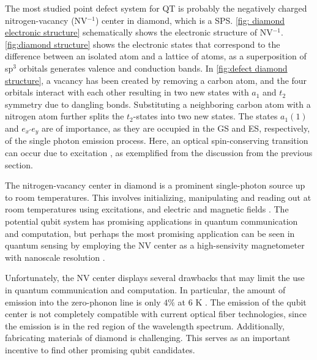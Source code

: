 The most studied point defect system for QT is probably the negatively charged nitrogen-vacancy (NV$^{-1}$) center in diamond, which is a SPS. \autoref{fig: diamond electronic structure} schematically shows the electronic structure of NV$^{-1}$. \autoref{fig:diamond structure} shows the electronic states that correspond to the difference between an isolated atom and a lattice of atoms, as a superposition of sp$^3$ orbitals generates valence and conduction bands.
In \autoref{fig:defect diamond structure}, a vacancy has been created by removing a carbon atom, and the four orbitals interact with each other resulting in two new states with $a_1$ and $t_2$ symmetry due to dangling bonds. Substituting a neighboring carbon atom with a nitrogen atom further splits the $t_2$-states into two new states.
The states $a_1(1)$ and $e_{x'}e_y$ are of importance, as they are occupied in the GS and ES, respectively, of the single photon emission process. Here, an optical spin-conserving transition can occur due to excitation \cite{Gordon2013}, as exemplified from the discussion from the previous section.

\noindent The nitrogen-vacancy center in diamond is a prominent single-photon source up to room temperatures. This involves initializing, manipulating and reading out at room temperatures using excitations, and electric and magnetic fields \cite{Gordon2013}. The potential qubit system has promising applications in quantum communication and computation, but
perhaps the most promising application can be seen in quantum sensing by employing the NV center as a high-sensivity magnetometer with nanoscale resolution \cite{Taylor2008}.

Unfortunately, the NV center displays several drawbacks that may limit the use in quantum communication and computation. In particular, the amount of emission into the zero-phonon line is only $4 \%$ at $6$ K \cite{Barclay2011}. The emission of the qubit center is not completely compatible with current optical fiber technologies, since the emission is in the red region of the wavelength spectrum. Additionally, fabricating materials of diamond is challenging. This serves as an important incentive to find other promising qubit candidates.

